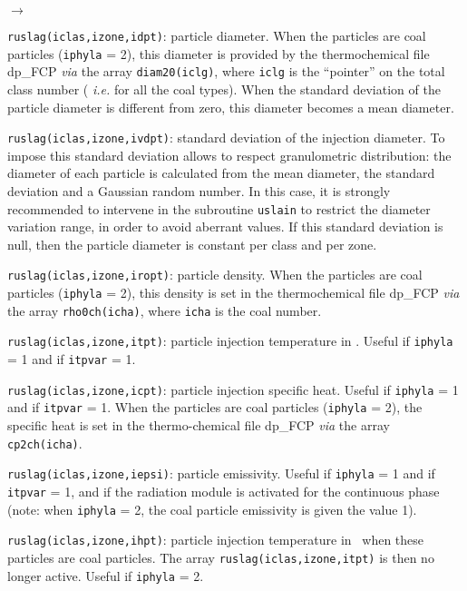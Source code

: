 {{{\begin{list}{$\rightarrow$}{}
\item \texttt{ruslag(iclas,izone,idpt)}: particle diameter. When the particles
      are coal particles (\texttt{iphyla} = 2), this diameter is provided by the
      thermochemical file dp\_FCP {\it via} the array \texttt{diam20(iclg)},
      where \texttt{iclg} is the ``pointer'' on the total class number ({\em
      i.e.} for all the coal types). When the standard deviation of the
      particle diameter is different from zero, this diameter becomes a
      mean diameter.

\item \texttt{ruslag(iclas,izone,ivdpt)}: standard deviation of the injection
      diameter. To impose this standard deviation allows to respect
      granulometric distribution: the diameter of each particle is
      calculated from the mean diameter, the standard deviation and a
      Gaussian random number. In this case, it is strongly recommended
      to intervene in the subroutine \texttt{uslain} to
      restrict the diameter variation range, in order to avoid
      aberrant values. If this standard deviation is null, then the
      particle diameter is constant per class and per zone.

\item \texttt{ruslag(iclas,izone,iropt)}: particle density. When the particles
      are coal particles (\texttt{iphyla} = 2), this density is set in the
      thermochemical file dp\_FCP {\em via} the array \texttt{rho0ch(icha)},
      where \texttt{icha} is the coal number.

\item \texttt{ruslag(iclas,izone,itpt)}: particle injection temperature in
      \degresC. Useful if \texttt{iphyla} = 1 and if \texttt{itpvar} = 1.

\item \texttt{ruslag(iclas,izone,icpt)}: particle injection specific heat. Useful
      if \texttt{iphyla} = 1 and if \texttt{itpvar} = 1. When the particles are coal
      particles (\texttt{iphyla} = 2), the specific heat is set in the
      thermo-chemical file dp\_FCP {\em via} the array \texttt{cp2ch(icha)}.

\item \texttt{ruslag(iclas,izone,iepsi)}: particle emissivity. Useful if
      \texttt{iphyla} = 1 and if \texttt{itpvar} = 1, and if the radiation
      module is activated for the continuous phase (note: when \texttt{iphyla} = 2,
      the coal particle emissivity is given the value 1).

\item \texttt{ruslag(iclas,izone,ihpt)}: particle injection temperature in
      \degresC\ when these particles are coal
      particles. The array \texttt{ruslag(iclas,izone,itpt)} is then no longer
      active. Useful if \texttt{iphyla} = 2.


\end{list}}}}
